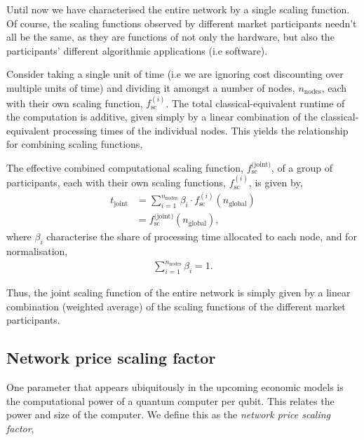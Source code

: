 Until now we have characterised the entire network by a single scaling function. Of course, the scaling functions observed by different market participants needn't all be the same, as they are functions of not only the hardware, but also the participants' different algorithmic applications (i.e software).

Consider taking a single unit of time (i.e we are ignoring cost discounting over multiple units of time) and dividing it amongst a number of nodes, $n_\text{nodes}$, each with their own scaling function, $f_\text{sc}^{(i)}$. The total classical-equivalent runtime of the computation is additive, given simply by a linear combination of the classical-equivalent processing times of the individual nodes. This yields the relationship for combining scaling functions,
\begin{definition}\label{def:comb_sc_func}
The effective combined computational scaling function, $f_\text{sc}^\text{(joint)}$, of a group of participants, each with their own scaling functions, $f_\text{sc}^{(i)}$, is given by,
\begin{align}
	t_\text{joint} &= \sum_{i=1}^{n_{\text{nodes}}} \beta_i \cdot f_\text{sc}^{(i)}(n_\text{global}) \nonumber \\
	&= f_\text{sc}^\text{(joint)}(n_\text{global}),
\end{align}
where $\beta_i$ characterise the share of processing time allocated to each node, and for normalisation,
\begin{align}
\sum_{i=1}^{n_\text{nodes}} \beta_i = 1.
\end{align}

\end{definition}

Thus, the joint scaling function of the entire network is simply given by a linear combination (weighted average) of the scaling functions of the different market participants.

%
%

\subsection{Network price scaling factor}\label{sec:NPSF}

One parameter that appears ubiquitously in the upcoming economic models is the computational power of a quantum computer per qubit. This relates the power and size of the computer. We define this as the \textit{network price scaling factor},

